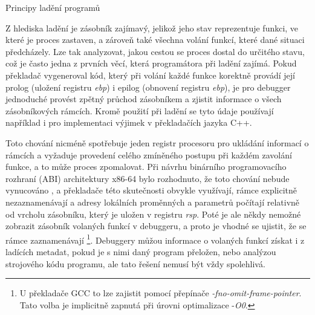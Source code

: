 \documentclass[czech,bachelor,male,python,dept460,hidelinks]{diploma}						%
\newcommand{\parspace}[1][]{
	\ifthenelse{\isempty{#1}}{\vspace{5mm}}{\vspace{#1}}
	\par
}
\begin{document}
\begin{section}{Principy ladění programů}
		
		\parspace Z hlediska ladění je zásobník zajímavý, jelikož jeho stav reprezentuje funkci, ve které je proces zastaven, a zároveň také všechna volání
		funkcí, které dané situaci předcházely. Lze tak analyzovat, jakou cestou se proces dostal do určitého stavu, což je často jedna z prvních věcí, která
		programátora při ladění zajímá. Pokud překladač vygeneroval kód, který při volání každé funkce korektně provádí její prolog (uložení registru \textit{ebp})
		i epilog (obnovení registru \textit{ebp}), je pro debugger jednoduché provést zpětný průchod zásobníkem a zjistit informace o všech zásobníkových rámcích.
		Kromě použití při ladění se tyto údaje používají například i pro implementaci výjimek v překladačích jazyka C++.
		
		\parspace Toto chování nicméně spotřebuje jeden registr procesoru pro ukládání informací o rámcích a vyžaduje provedení celého zmíněného postupu při každém
		zavolání funkce, a to může proces zpomalovat. Při návrhu binárního programovacího rozhraní (ABI) architektury x86-64 bylo rozhodnuto, že toto chování nebude
		vynucováno \cite[16]{x64abi}, a překladače této skutečnosti obvykle využívají, rámce explicitně nezaznamenávají a adresy
		lokálních proměnných a parametrů počítají relativně od vrcholu zásobníku, který je uložen v registru \textit{rsp}.
		Poté je ale někdy nemožné zobrazit zásobník volaných funkcí v debuggeru, a proto je vhodné se ujistit,
		že se rámce zaznamenávají \footnote{U překladače GCC to lze zajistit pomocí přepínače \textit{-fno-omit-frame-pointer}.
		Tato volba je implicitně zapnutá při úrovni optimalizace -\textit{O0}. }.
		Debuggery můžou informace o volaných funkcí získat i z ladících metadat, pokud je s nimi daný program přeložen,
		nebo analýzou strojového kódu programu, ale tato řešení nemusí být vždy spolehlivá.
\end{section}
\end{document}
